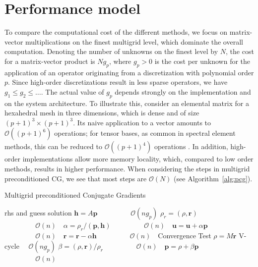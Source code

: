 \documentclass[smallcondensed,final]{svjour3}     %
\newcommand{\bs}[1]{\ensuremath{\boldsymbol #1}}
\begin{document}
\section{Performance model}
To compare the computational cost of the different methods, we focus
on matrix-vector multiplications on the finest multigrid level, which
dominate the overall computation. Denoting the number of unknowns on
the finest level by $N$, the cost for a matrix-vector product is
$Ng_p$, where $g_p>0$ is the cost per unknown for the application of
an operator originating from a discretization with polynomial order
$p$. Since high-order discretizations result in less sparse operators,
we have $g_1\le g_2\le \ldots$. The actual value of $g_p$ depends
strongly on the implementation and on the system architecture. To
illustrate this, consider an elemental matrix for a hexahedral mesh in
three dimensions, which is dense and of size $(p+1)^3\times
(p+1)^3$. Its naive application to a vector amounts to $\mathcal
O((p+1)^6)$ operations; for tensor bases, as common in spectral
element methods, this can be reduced to $\mathcal O((p+1)^4)$
operations \cite{DevilleFischerMund02}. In addition, high-order
implementations allow more memory locality, which, compared to low
order methods, results in higher performance. When considering 
the steps in multigrid preconditioned CG, we see that most steps
are $\mathcal{O}(N)$ (see Algorithm~\ref{alg:pcg}). 


\begin{algorithm}[ht] 
	\caption{Multigrid preconditioned Conjugate Gradients} \label{alg:pcg} 
	\begin{algorithmic}[1]
		\Require rhs and guess
		\Ensure  solution
			\State $\bs{h} = A \bs{p}$ 											\Comment $~~\quad\quad\quad\quad\mathcal{O}(ng_p)$
			\State $\rho_r = (\rho, \bs{r})$								\Comment $~~\quad\quad\quad\quad\mathcal{O}(n)~~~$
			\State $\alpha = \rho_r / ( \bs{p}, \bs{h} )$		\Comment $~~\quad\quad\quad\quad\mathcal{O}(n)~~~$
			\State $\bs{u} = \bs{u} + \alpha\bs{p}$					\Comment $~~\quad\quad\quad\quad\mathcal{O}(n)~~~$
			\State $\bs{r} = \bs{r} - \alpha\bs{h}$					\Comment $~~\quad\quad\quad\quad\mathcal{O}(n)~~~$
			\State Convergence Test
			\State $\rho = M\bs{r}$ 												\Comment V-cycle $\quad\mathcal{O}(ng_p)$
      \State $\beta = (\rho, \bs{r}) / \rho_r$				\Comment $~~\quad\quad\quad\quad\mathcal{O}(n)~~~$
      \State $\bs{p} = \rho + \beta\bs{p}$						\Comment $~~\quad\quad\quad\quad\mathcal{O}(n)~~~$
		\EndWhile
	\end{algorithmic}
\end{algorithm}
\end{document}
